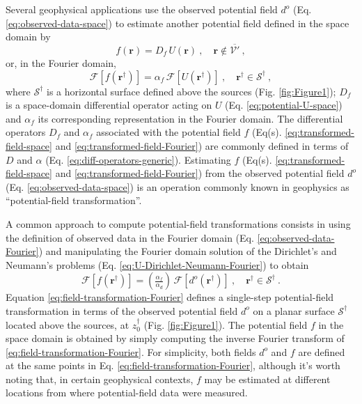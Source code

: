 Several geophysical applications use the observed potential field 
$d^{o}$ (Eq. \ref{eq:observed-data-space}) to estimate another potential field 
defined in the space domain by
\begin{equation}
	f(\mathbf{r}) = D_{f} \, U(\mathbf{r}) \: , 
	\quad \mathbf{r} \notin \overline{\mathcal{V}'} \: ,
	\label{eq:transformed-field-space}
\end{equation}
or, in the Fourier domain, 
\begin{equation}
	\mathcal{F} [ f(\mathbf{r}^{\dagger}) ] =
	\alpha_{f} \, \mathcal{F} [ U(\mathbf{r}^{\dagger}) ] \: ,
	\quad \mathbf{r}^{\dagger} \in \mathcal{S}^{\dagger} \: ,
	\label{eq:transformed-field-Fourier}
\end{equation}
where $\mathcal{S}^{\dagger}$ is a horizontal surface defined above the sources (Fig. \ref{fig:Figure1});
$D_{f}$ is a space-domain differential operator acting on $U$ (Eq. \ref{eq:potential-U-space}) and
$\alpha_{f}$ its corresponding representation in the Fourier domain.
The differential operators $D_{f}$ and $\alpha_{f}$ associated with the potential field 
$f$ (Eq(s). \ref{eq:transformed-field-space} and \ref{eq:transformed-field-Fourier}) are commonly
defined in terms of $D$ and $\alpha$ (Eq. \ref{eq:diff-operators-generic}). 
Estimating $f$ (Eq(s). \ref{eq:transformed-field-space} and \ref{eq:transformed-field-Fourier}) from 
the observed potential field $d^{o}$ (Eq. \ref{eq:observed-data-space}) is an operation 
commonly known in geophysics as ``potential-field transformation''.

A common approach to compute potential-field transformations \citep[e.g.,][]{gunn1975} 
consists in using the definition of observed data in the Fourier domain (Eq. \ref{eq:observed-data-Fourier}) 
and manipulating the Fourier domain solution of the Dirichlet's and Neumann's problems 
(Eq. \ref{eq:U-Dirichlet-Neumann-Fourier}) to obtain
\begin{equation}
	\mathcal{F} [ f(\mathbf{r}^{\dagger}) ] =
	\left( \tfrac{\alpha_{f}}{\alpha_{d}} \right) \, \mathcal{F} \left[ d^{o}(\mathbf{r}^{\dagger}) \right] \: , 
	\quad \mathbf{r}^{\dagger} \in \mathcal{S}^{\dagger} \: .
	\label{eq:field-transformation-Fourier}
\end{equation}
Equation \ref{eq:field-transformation-Fourier} defines a single-step potential-field transformation 
in terms of the observed potential field $d^{o}$ on a planar surface $\mathcal{S}^{\dagger}$ 
located above the sources, at $z^{\dagger}_{0}$ (Fig. \ref{fig:Figure1}). 
The potential field $f$ in the space domain is obtained by simply computing the inverse Fourier 
transform of \ref{eq:field-transformation-Fourier}.
For simplicity, both fields $d^o$ and $f$ are defined at the same points in Eq. \ref{eq:field-transformation-Fourier}, 
although it's worth noting that, in certain geophysical contexts, $f$ may be estimated at different locations from 
where potential-field data were measured.

